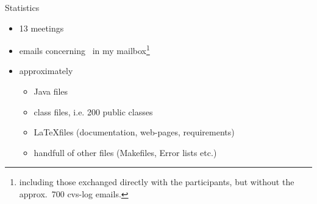 \begin{myslide}{Statistics}
  \begin{itemize}
  \item 13 meetings
  \item {} emails concerning \Slime\ in my
    mailbox\footnote{including those exchanged directly with the
      participants, but without the approx.\ 700 cvs-log emails.}
  \item approximately
    \begin{itemize}
    \item {} Java files
    \item {} class files, i.e. 200 public classes
    \item {}  \LaTeX files (documentation, web-pages, requirements)
    \item handfull of other files (Makefiles, Error lists etc.)
    \end{itemize}
  \end{itemize}
  
\end{myslide}






